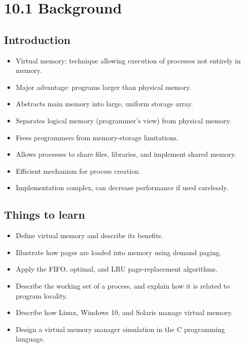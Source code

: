 \section{10.1 Background}

\subsection{Introduction}
\begin{itemize}
    \item Virtual memory: technique allowing execution of processes not entirely in memory.
    \item Major advantage: programs larger than physical memory.
    \item Abstracts main memory into large, uniform storage array.
    \item Separates logical memory (programmer's view) from physical memory.
    \item Frees programmers from memory-storage limitations.
    \item Allows processes to share files, libraries, and implement shared memory.
    \item Efficient mechanism for process creation.
    \item Implementation complex, can decrease performance if used carelessly.
\end{itemize}

\subsection{Things to learn}
\begin{itemize}
    \item Define virtual memory and describe its benefits.
    \item Illustrate how pages are loaded into memory using demand paging.
    \item Apply the FIFO, optimal, and LRU page-replacement algorithms.
    \item Describe the working set of a process, and explain how it is related to program locality.
    \item Describe how Linux, Windows 10, and Solaris manage virtual memory.
    \item Design a virtual memory manager simulation in the C programming language.
\end{itemize}

